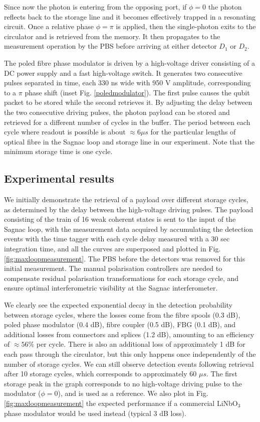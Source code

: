 \documentclass[%
reprint,
superscriptaddress,
 amsmath,amssymb,
 aps,
 prx,
floatfix,
]{revtex4-2}
\begin{document}
Since now the photon is entering from the opposing port, if $\phi=0$ the photon reflects back to the storage line and it becomes effectively trapped in a resonating circuit. Once a relative phase $\phi=\pi$ is applied, then the single-photon exits to the circulator and is retrieved from the memory. It then propagates to the measurement operation by the PBS before arriving at either detector $D_1$ or $D_2$.

The poled fibre phase modulator is driven by a high-voltage driver consisting of a DC power supply and a fast high-voltage switch. It generates two consecutive pulses separated in time, each 330 ns wide with 950 V amplitude, corresponding to a $\pi$ phase shift (inset Fig. \ref{poledmodulator}). The first pulse causes the qubit packet to be stored while the second retrieves it. By adjusting the delay between the two consecutive driving pulses, the photon payload can be stored and retrieved for a different number of cycles in the buffer. The period between each cycle where readout is possible is about $\approx 6 \mu s$ for the particular lengths of optical fibre in the Sagnac loop and storage line in our experiment. Note that the minimum storage time is one cycle.   


\subsection*{Experimental results}

We initially demonstrate the retrieval of a payload over different storage cycles, as determined by the delay between the high-voltage driving pulses. The payload consisting of the train of 16 weak coherent states is sent to the input of the Sagnac loop, with the measurement data acquired by accumulating the detection events with the time tagger with each cycle delay measured with a 30 sec integration time, and all the curves are superposed and plotted in Fig. \ref{fig:maxloopmeasurement}. The PBS before the detectors was removed for this initial measurement. The manual polarisation controllers are needed to compensate residual polarisation transformations for each storage cycle, and ensure optimal interferometric visibility at the Sagnac interferometer.

We clearly see the expected exponential decay in the detection probability between storage cycles, where the losses come from the fibre spools (0.3 dB), poled phase modulator (0.4 dB), fibre coupler (0.5 dB), FBG (0.1 dB), and additional losses from connectors and splices (1.2 dB), amounting to an efficiency of $\approx 56\%$ per cycle. There is also an additional loss of approximately 1 dB for each pass through the circulator, but this only happens once independently of the number of storage cycles. We can still observe detection events following retrieval after 10 storage cycles, which corresponds to approximately 60 $\mu s$. The first storage peak in the graph corresponds to no high-voltage driving pulse to the modulator ($\phi = 0$), and is used as a reference. We also plot in Fig. \ref{fig:maxloopmeasurement} the expected performance if a commercial LiNbO$_3$ phase modulator would be used instead (typical 3 dB loss).
\end{document}
